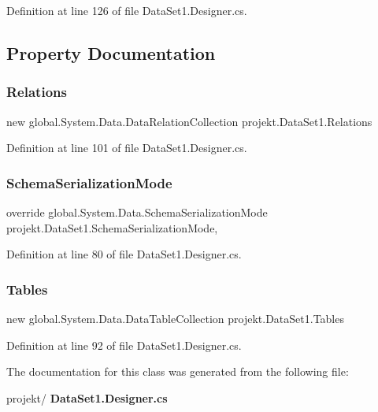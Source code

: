 Definition at line 126 of file Data\+Set1.\+Designer.\+cs.



\subsection{Property Documentation}
\mbox{\label{classprojekt_1_1DataSet1_a6b93e786dcf82bd1c416e96311c865e2}} 
\subsubsection{Relations}
{\footnotesize\ttfamily new global.\+System.\+Data.\+Data\+Relation\+Collection projekt.\+Data\+Set1.\+Relations\hspace{0.3cm}{\ttfamily [get]}}



Definition at line 101 of file Data\+Set1.\+Designer.\+cs.

\mbox{\label{classprojekt_1_1DataSet1_a427450e2d66c48970331311264026734}} 
\subsubsection{Schema\+Serialization\+Mode}
{\footnotesize\ttfamily override global.\+System.\+Data.\+Schema\+Serialization\+Mode projekt.\+Data\+Set1.\+Schema\+Serialization\+Mode\hspace{0.3cm}{\ttfamily [get]}, {\ttfamily [set]}}



Definition at line 80 of file Data\+Set1.\+Designer.\+cs.

\mbox{\label{classprojekt_1_1DataSet1_a1991a0961ae830e41f424a830589a720}} 
\subsubsection{Tables}
{\footnotesize\ttfamily new global.\+System.\+Data.\+Data\+Table\+Collection projekt.\+Data\+Set1.\+Tables\hspace{0.3cm}{\ttfamily [get]}}



Definition at line 92 of file Data\+Set1.\+Designer.\+cs.



The documentation for this class was generated from the following file\+:\begin{DoxyCompactItemize}
\item 
projekt/\textbf{ Data\+Set1.\+Designer.\+cs}\end{DoxyCompactItemize}
